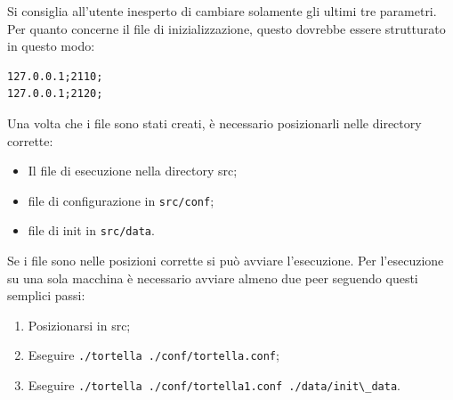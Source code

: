 Si consiglia all'utente inesperto di cambiare solamente gli ultimi tre parametri. Per quanto concerne il file di inizializzazione, questo dovrebbe essere strutturato in questo modo:
\begin{lstlisting}
127.0.0.1;2110;
127.0.0.1;2120;
\end{lstlisting}
Una volta che i file sono stati creati, è necessario posizionarli nelle directory corrette:
\begin{itemize}
\item Il file di esecuzione nella directory src;
\item file di configurazione in \lstinline{src/conf};
\item file di init in \lstinline{src/data}.
\end{itemize}
Se i file sono nelle posizioni corrette si può avviare l'esecuzione. Per l'esecuzione su una sola macchina è necessario avviare almeno due peer seguendo questi semplici passi:
\begin{enumerate}
\item Posizionarsi in src;
\item Eseguire \lstinline{./tortella ./conf/tortella.conf};
\item Eseguire \lstinline{./tortella ./conf/tortella1.conf ./data/init\_data}. 
\end{enumerate}
